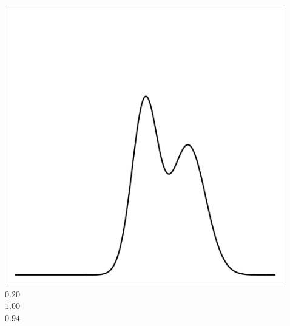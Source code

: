 \documentclass{beamer}
\begin{document}
\begin{frame}[t]
\begin{columns}[c]
\begin{flushright}
            \end{flushright}
            \begin{flushright}
                \includegraphics[width=1\textwidth]{bayesian_update_illustration_th2.pdf}\\
                \vspace{10pt}
                \Large $0.20$\\
                \vspace{20pt}
                \Large $1.00$\\
                \vspace{20pt}
                \Large $0.94$
            \end{flushright}
            \begin{flushright}

\end{flushright}
\end{columns}
\end{frame}
\end{document}
